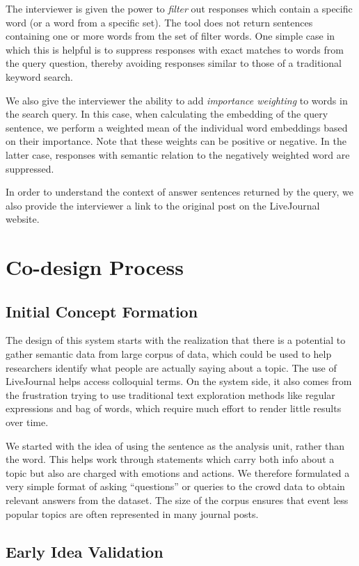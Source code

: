 \documentclass{sigchi}
\begin{document}
The interviewer is given the power to {\em filter} out responses which contain a specific word (or a word from a specific set). The tool does not return sentences containing one or more words from the set of filter words. One simple case in which this is helpful is to suppress responses with exact matches to words from the query question, thereby avoiding responses similar to those of a traditional keyword search.

We also give the interviewer the ability to add {\em importance weighting} to words in the search query. In this case, when calculating the embedding of the query sentence, we perform a weighted mean of the individual word embeddings based on their importance. Note that these weights can be positive or negative. In the latter case, responses with semantic relation to the negatively weighted word are suppressed.

In order to understand the context of answer sentences returned by the query, we also provide the interviewer a link to the original post on the LiveJournal website. 

\section{Co-design Process}
\subsection{Initial Concept Formation}
The design of this system starts with the realization that there is a potential to gather semantic data from large corpus of data, which could be used to help researchers identify what people are actually saying about a topic. The use of LiveJournal helps access colloquial terms. On the system side, it also comes from the frustration trying to use traditional text exploration methods like regular expressions and bag of words, which require much effort to render little results over time.

We started with the idea of using the sentence as the analysis unit, rather than the word. This helps work through statements which carry both info about a topic but also are charged with emotions and actions. We therefore formulated a very simple format of asking ``questions'' or queries to the crowd data to obtain relevant answers from the dataset. The size of the corpus ensures that event less popular topics are often represented in many journal posts. 

\subsection{Early Idea Validation}
\end{document}
